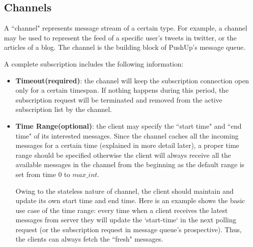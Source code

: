 \subsection{Channels\\}

A ``channel" represents message stream of a certain type. For example, a
channel may be used to represent the feed of a specific user's tweets in
twitter, or the articles of a blog. The channel is the building block of 
PushUp's message queue.

A complete subscription includes the following information:

\begin{itemize}
    \item {\bf Timeout(required)}: the channel will keep the subscription 
        connection open only for a certain timespan. If nothing happens 
        during this period, the
        subscription request will be terminated and removed from the active 
        subscription list by the channel.
    \item {\bf Time Range(optional)}: the client may specify the ``start time"
        and ``end time" of its interested messages. Since the channel 
        caches all the incoming messages for a certain time (explained in more detail later), 
        a proper time range should be specified otherwise the client will 
        always receive all the available messages in the channel from the beginning
		as the default range is set from time $0$ to $max\_int$.

        Owing to the stateless nature of channel, the client should 
        maintain and update its own start time and end time. 
        Here is an example shows the basic use case of the time range:
        every time when a client receives the latest messages from server
        they will update the `start-time` in the next polling request (or 
        the subscription request in message queue's prospective). Thus, the
        clients can always fetch the ``fresh" messages.
\end{itemize}

